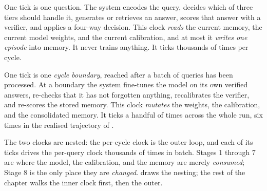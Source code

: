 \begin{description}[leftmargin=0pt, labelsep=0.5em, style=nextline]
  \item[The per-query clock (Stages 1 to 7).] One tick is one question. The
  system encodes the query, decides which of three tiers should handle it,
  generates or retrieves an answer, scores that answer with a verifier, and
  applies a four-way decision. This clock \emph{reads} the current memory, the
  current model weights, and the current calibration, and at most it \emph{writes
  one episode} into memory. It never trains anything. It ticks thousands of times
  per cycle.

  \item[The per-cycle clock (Stage 8).] One tick is one \emph{cycle boundary},
  reached after a batch of queries has been processed. At a boundary the system
  fine-tunes the model on its own verified answers, re-checks that it has not
  forgotten anything, recalibrates the verifier, and re-scores the stored
  memory. This clock \emph{mutates} the weights, the calibration, and the
  consolidated memory. It ticks a handful of times across the whole run, six
  times in the realised trajectory of .
\end{description}

The two clocks are nested: the per-cycle clock is the outer loop, and each of its
ticks drives the per-query clock thousands of times in batch. Stages 1 through 7
are where the model, the calibration, and the memory are merely \emph{consumed};
Stage 8 is the only place they are \emph{changed}.  draws
the nesting; the rest of the chapter walks the inner clock first, then the outer.

